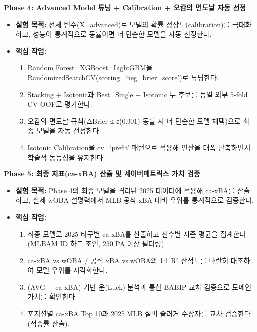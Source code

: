 \documentclass[
  11.5pt,
]{article}
\providecommand{\tightlist}{%
  \setlength{\itemsep}{0pt}\setlength{\parskip}{0pt}}
\begin{document}
\textbf{Phase 4: Advanced Model 튜닝 + Calibration + 오캄의 면도날 자동
선정}

\begin{itemize}
\tightlist
\item
  \textbf{실험 목적:} 전체 변수(X\_advanced)로 모델의 확률
  정상도(calibration)를 극대화하고, 성능이 통계적으로 동률이면 더 단순한
  모델을 자동 선정한다.
\item
  \textbf{핵심 작업:}

  \begin{enumerate}
  \def\labelenumi{\arabic{enumi}.}
  \tightlist
  \item
    Random Forest·XGBoost·LightGBM을
    RandomizedSearchCV(scoring=`neg\_brier\_score')로 튜닝한다.
  \item
    Stacking + Isotonic과 Best\_Single + Isotonic 두 후보를 동일 외부
    5-fold CV OOF로 평가한다.
  \item
    오캄의 면도날 규칙(ΔBrier ≤ ε(0.001) 동률 시 더 단순한 모델
    채택)으로 최종 모델을 자동 선정한다.
  \item
    Isotonic Calibration을 cv=`prefit' 패턴으로 적용해 연산을 대폭
    단축하면서 학술적 동등성을 유지한다.
  \end{enumerate}
\end{itemize}

\textbf{Phase 5: 최종 지표(ca-xBA) 산출 및 세이버메트릭스 가치 검증}

\begin{itemize}
\tightlist
\item
  \textbf{실험 목적:} Phase 4의 최종 모델을 격리된 2025 데이터에 적용해
  ca-xBA를 산출하고, 실제 wOBA 설명력에서 MLB 공식 xBA 대비 우위를
  통계적으로 검증한다.
\item
  \textbf{핵심 작업:}

  \begin{enumerate}
  \def\labelenumi{\arabic{enumi}.}
  \tightlist
  \item
    최종 모델로 2025 타구별 ca-xBA를 산출하고 선수별 시즌 평균을
    집계한다(MLBAM ID 하드 조인, 250 PA 이상 필터링).
  \item
    ca-xBA vs wOBA / 공식 xBA vs wOBA의 1:1 R² 산점도를 나란히 대조하여
    모델 우위를 시각화한다.
  \item
    (AVG − ca-xBA) 기반 운(Luck) 분석과 통산 BABIP 교차 검증으로 도메인
    가치를 확인한다.
  \item
    포지션별 ca-xBA Top 10과 2025 MLB 실버 슬러거 수상자를 교차
    검증한다(적중률 산출).
  \end{enumerate}
\end{itemize}
\end{document}
